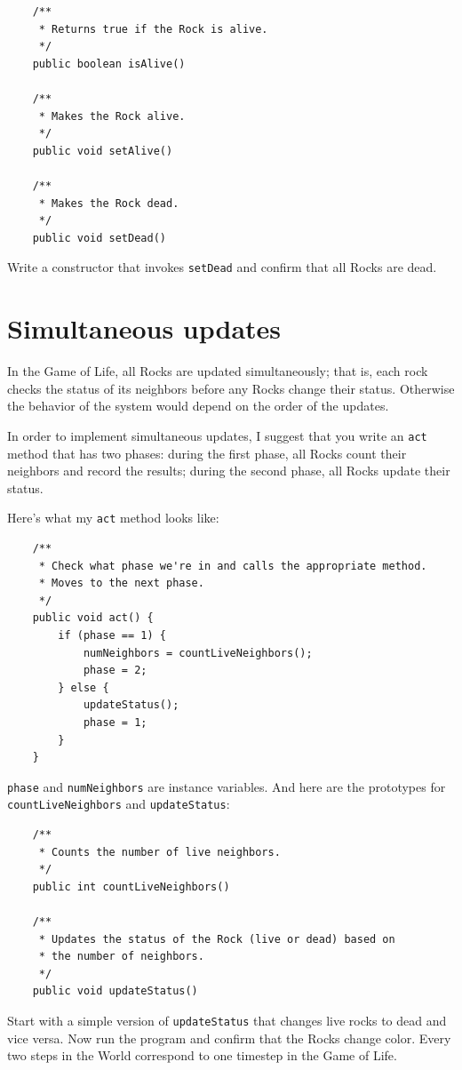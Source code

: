 \documentclass[12pt]{book}
\theoremstyle{exercise}
\begin{document}
\begin{lstlisting}
    /**
     * Returns true if the Rock is alive.
     */
    public boolean isAlive()

    /**
     * Makes the Rock alive.
     */
    public void setAlive()

    /**
     * Makes the Rock dead.
     */
    public void setDead()
\end{lstlisting}

Write a constructor that invokes {\tt setDead} and confirm that
all Rocks are dead.


\section{Simultaneous updates}

In the Game of Life, all Rocks are updated simultaneously; that is,
each rock checks the status of its neighbors before any Rocks
change their status.  Otherwise the behavior of the system would
depend on the order of the updates.

In order to implement simultaneous updates, I suggest that you write
an {\tt act} method that has two phases: during the first phase,
all Rocks count their neighbors and record the results; during the
second phase, all Rocks update their status.

Here's what my {\tt act} method looks like:

\begin{lstlisting}
    /**
     * Check what phase we're in and calls the appropriate method.
     * Moves to the next phase.
     */
    public void act() {
        if (phase == 1) {
            numNeighbors = countLiveNeighbors();
            phase = 2;
        } else {
            updateStatus();
            phase = 1;
        }
    }
\end{lstlisting}

{\tt phase} and {\tt numNeighbors} are instance variables.
And here are the prototypes for {\tt countLiveNeighbors} and
{\tt updateStatus}:

\begin{lstlisting}
    /**
     * Counts the number of live neighbors.
     */
    public int countLiveNeighbors()

    /**
     * Updates the status of the Rock (live or dead) based on
     * the number of neighbors.
     */
    public void updateStatus()
\end{lstlisting}

Start with a simple version of {\tt updateStatus} that changes live
rocks to dead and vice versa.  Now run the program and confirm that
the Rocks change color.  Every two steps in the World correspond to
one timestep in the Game of Life.
\end{document}
